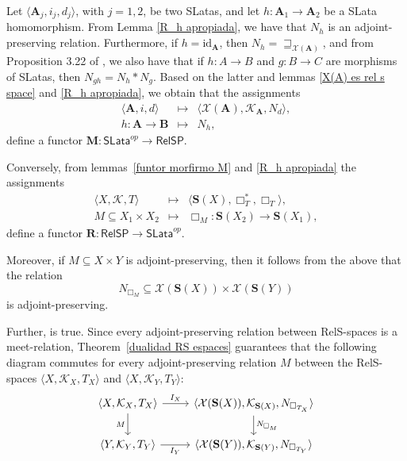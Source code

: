 \documentclass{article}
\begin{document}
Let $\langle \mathbf{A}_j, i_j, d_j \rangle$, with $j = 1, 2$, be two SLatas, and let $h : \mathbf{A}_1 \to \mathbf{A}_2$ be a SLata homomorphism. From Lemma \ref{R_h apropiada}, we have that $N_h$ is an adjoint-preserving relation. Furthermore, if $h = \mathrm{id}_{\mathbf{A}}$, then $N_h = \sqsupseteq_{\mathcal{X}(\mathbf{A})}$, and from Proposition 3.22 of \cite{CG}, we also have that if $h : A \to B$ and $g : B \to C$ are morphisms of SLatas, then $N_{g h} = N_h \ast N_g$. Based on the latter and lemmas \ref{X(A) es rel s space} and \ref{R_h apropiada}, we obtain that the assignments
\[
\begin{array}{ccl}
   \langle\mathbf{A}, i, d\rangle & \mapsto & \langle \mathcal{X}(\mathbf{A}), \mathcal{K}_\mathbf{A}, N_{d} \rangle, \\
   h: \mathbf{A}\to \mathbf{B} & \mapsto & N_h, 
\end{array}
\]
define a functor \(\mathbf{M} : \mathsf{SLata}^{op} \to \mathsf{RelSP}\).

Conversely, from lemmas~\ref{funtor morfirmo M} and \ref{R_h apropiada} the assignments
\[
\begin{array}{ccl}
    \langle X,\mathcal{K},T\rangle  & \mapsto & \langle \mathbf{S}(X),\Box_{T}^{*},\Box_{T}\rangle, \\
     M\subseteq X_1\times X_2 & \mapsto & \Box_{M}: \mathbf{S}(X_2)\to \mathbf{S}(X_1), 
\end{array}
\]
define a functor $\mathbf{R}:\mathsf{RelSP} \rightarrow \mathsf{SLata}^{op}$.

Moreover, if $M \subseteq X \times Y$ is adjoint-preserving, then it follows from the above that the relation
\[
N_{\Box_M} \subseteq \mathcal{X}(\mathbf{S}(X)) \times \mathcal{X}(\mathbf{S}(Y))
\]
is adjoint-preserving.

Further, is true. Since every adjoint-preserving relation between RelS-spaces is a meet-relation, Theorem~\ref{dualidad RS espaces} guarantees that the following diagram commutes for every adjoint-preserving relation $M$ between the RelS-spaces $\langle X,\mathcal{K}_X,T_X\rangle$ and $\langle X,\mathcal{K}_Y,T_Y\rangle$:
\[
\begin{tikzcd}
\langle X,\mathcal{K}_X,T_X\rangle 
\arrow[r,"I_X"] 
\arrow[d,"M"'] 
& 
\langle \mathcal{X}(\mathbf{S}(X)),\mathcal{K}_{\mathbf{S}(X)},N_{\Box_{T_X}}\rangle 
\arrow[d,"N_{\Box_M}"] \\
\langle Y,\mathcal{K}_{Y},T_Y\rangle 
\arrow[r,"I_Y"'] 
& 
\langle \mathcal{X}(\mathbf{S}(Y)),\mathcal{K}_{\mathbf{S}(Y)},N_{\Box_{T_Y}}\rangle
\end{tikzcd}
\]
\end{document}
